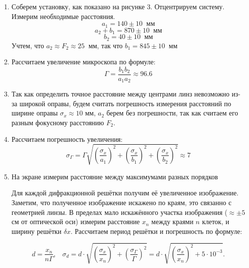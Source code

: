 \documentclass[a4paper,12pt]{article}
\begin{document}
\begin{enumerate}
\itemsep0em
\item Соберем установку, как показано на рисунке 3. Отцентрируем систему. Измерим необходимые расстояния. 
\[a_1 = 140 \pm 10\;\; \text{мм}\]
\[a_2 + b_1 = 870 \pm 10\;\; \text{мм}\]
\[b_2 = 40 \pm 10\;\; \text{мм}\]
Учтем, что $a_2\approx F_2\approx 25 \;\;\text{мм}$, так что $b_1 = 845 \pm 10 \;\;\text{мм}$
\item Рассчитаем увеличение микроскопа по формуле:
\[\Gamma = \frac{b_1b_2}{a_1a_2} \approx 96.6\]
\item Так как определить точное расстояние между центрами линз невозможно из-за широкой оправы, будем считать погрешность измерения расстояний по ширине оправы $\sigma_{x}\approx 10$ мм, $a_2$ берем без погрешности, так как считаем его разным фокусному расстоянию $F_2$.  
\item Рассчитаем погрешность увеличения:
\[\sigma_{\Gamma} =\Gamma \sqrt{\left(\frac{\sigma_{x}}{ a_1}\right)^2 + \left(\frac{\sigma_{x}}{b_1}\right)^2+ \left(\frac{\sigma_{x}}{ b_2}\right)^2}\approx 7\]

\item На экране измерим расстояние между максимумами разных порядков 
 
Для каждой дифракционной решётки получим её увеличенное изображение. Заметим, что полученное изображение искажено по краям, это связанно с геометрией линзы. В пределах мало искажённого участка изображения ($\approx \pm 5$ см от оптической оси) измерим расстояние $x_n$ между краями $n$ клеток, и ширину решётки $\delta x$. Рассчитаем период решётки и погрешность по формуле:

\[
d = \frac{x_n}{n \Gamma}, \;\;\; \sigma_d = d \cdot \sqrt{\left( \frac{\sigma_x}{x_n} \right) ^ 2 + \left( \frac{\sigma_\Gamma}{\Gamma} \right) ^ 2 } = d \cdot \sqrt{\left( \frac{\sigma_x}{x_n} \right) ^ 2 + 5 \cdot 10^{-3} }.
\]


\end{enumerate}
\end{document}

